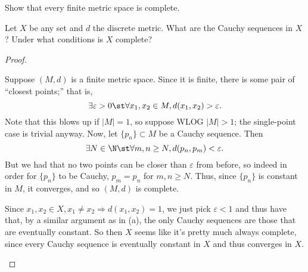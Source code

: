 \documentclass{assignment}
\begin{document}
\begin{question}[2]
  \begin{qparts}
    \item Show that every finite metric space is complete.
    \item Let $X$ be any set and $d$ the discrete metric. What are the Cauchy sequences in $X$? Under 
what conditions is $X$ complete?
  \end{qparts}
\end{question}
\begin{proof}\leavevmode
  \begin{qparts}
     \item Suppose $(M, d)$ is a finite metric space. Since it is finite, there is some pair of ``closest
points;'' that is, $$\exists \varepsilon > 0 \st \forall x_1, x_2 \in M, d(x_1, x_2) > \varepsilon.$$ 
Note that this blows up if $|M| = 1$, so suppose WLOG $|M| > 1$; the single-point case is trivial anyway.
Now, let $\{p_n\} \subset M$ be a Cauchy sequence. Then $$\exists N\in\N \st \forall m,n \geq N, 
d(p_n, p_m) < \varepsilon.$$ But we had that no two points can be closer than $\varepsilon$ from before,
so indeed in order for $\{p_n\}$ to be Cauchy, $p_m = p_n$ for $m,n \geq N$. Thus, since $\{p_n\}$ is 
constant in $M$, it converges, and so $(M, d)$ is complete.

    \item Since $x_1, x_2 \in X, x_1 \neq x_2 \Rightarrow d(x_1, x_2) = 1$, we just pick $\varepsilon
< 1$ and thus have that, by a similar argument as in (a), the only Cauchy sequences are those that 
are eventually constant. So then $X$ seems like it's pretty much always complete, since every Cauchy
sequence is eventually constant in $X$ and thus converges in $X$.
  \end{qparts}
\end{proof}
\end{document}
